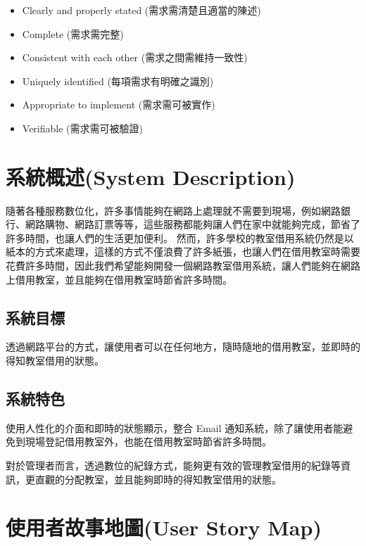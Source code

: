 \documentclass{article}
\begin{document}
\begin{itemize}
	\color{blue}
	\item Clearly and properly stated (需求需清楚且適當的陳述)
	\item Complete (需求需完整)
	\item Consistent with each other (需求之間需維持一致性)
	\item Uniquely identified (每項需求有明確之識別)
	\item Appropriate to implement (需求需可被實作)
	\item Verifiable (需求需可被驗證)
\end{itemize}

\newpage

\section[系統概述(SYSTEM DESCRIPTION)]{系統概述(System Description)}

隨著各種服務數位化，許多事情能夠在網路上處理就不需要到現場，例如網路銀行、網路購物、網路訂票等等，這些服務都能夠讓人們在家中就能夠完成，節省了許多時間，也讓人們的生活更加便利。
然而，許多學校的教室借用系統仍然是以紙本的方式來處理，這樣的方式不僅浪費了許多紙張，也讓人們在借用教室時需要花費許多時間，因此我們希望能夠開發一個網路教室借用系統，讓人們能夠在網路上借用教室，並且能夠在借用教室時節省許多時間。

\subsection{系統目標}

透過網路平台的方式，讓使用者可以在任何地方，隨時隨地的借用教室，並即時的得知教室借用的狀態。

\subsection{系統特色}

使用人性化的介面和即時的狀態顯示，整合 Email 通知系統，除了讓使用者能避免到現場登記借用教室外，也能在借用教室時節省許多時間。

\bigskip

對於管理者而言，透過數位的紀錄方式，能夠更有效的管理教室借用的紀錄等資訊，更直觀的分配教室，並且能夠即時的得知教室借用的狀態。

\newpage

\section[使用者故事地圖(USER STORY MAP)]{使用者故事地圖(User Story Map)}
\end{document}
